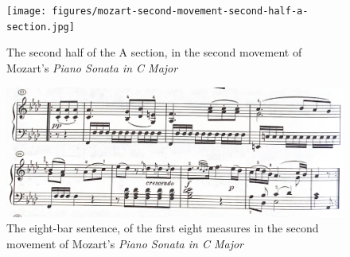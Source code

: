 \begin{figure}
	\centering
	\texttt{[image: figures/mozart-second-movement-second-half-a-section.jpg]}
	\caption{The second half of the A section, in the second movement of Mozart's \textit{Piano Sonata in C Major}}
	\label{fig:mozart-second-movement-second-half-a-section}
\end{figure}

\begin{figure}
	\centering
	\includegraphics[width=\textwidth]{figures/mozart-second-movement-b-section-eight-bar-sentence.jpg}
	\caption{The eight-bar sentence, of the first eight measures in the second movement of Mozart's \textit{Piano Sonata in C Major}}
	\label{fig:mozart-second-movement-b-section-eight-bar-sentence}
\end{figure}

